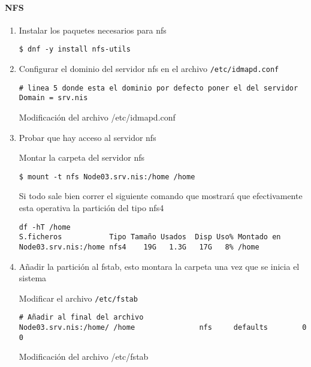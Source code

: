 \documentclass[../main.tex]{subfiles}
\begin{document}
\paragraph{NFS}
\begin{enumerate}
  \item Instalar los paquetes necesarios para \Gls{nfs}
        \begin{listing}[H]
\begin{verbatim}
$ dnf -y install nfs-utils
\end{verbatim}
        \end{listing}
  \item Configurar el dominio del servidor \Gls{nfs} en el
        archivo \texttt{/etc/idmapd.conf}
        \begin{listing}[H]
\begin{verbatim}
# linea 5 donde esta el dominio por defecto poner el del servidor
Domain = srv.nis
\end{verbatim}
          \label{list:idmap}
          \caption{Modificación del archivo /etc/idmapd.conf}
        \end{listing}

  \item Probar que hay acceso al servidor \Gls{nfs}

        Montar la carpeta del servidor \Gls{nfs}
        \begin{listing}[H]
\begin{verbatim}
$ mount -t nfs Node03.srv.nis:/home /home
\end{verbatim}
        \end{listing}

        Si todo sale bien correr el siguiente comando que mostrará que
        efectivamente esta operativa la partición del tipo \Gls{nfs}4
        \begin{listing}[H]
\begin{verbatim}
df -hT /home
S.ficheros           Tipo Tamaño Usados  Disp Uso% Montado en
Node03.srv.nis:/home nfs4    19G   1.3G   17G   8% /home
\end{verbatim}
        \end{listing}

  \item Añadir la partición al \Gls{fstab}, esto montara la carpeta una vez
        que se inicia el sistema

        Modificar el archivo \texttt{/etc/fstab}
        \begin{listing}[H]
\begin{verbatim}
# Añadir al final del archivo
Node03.srv.nis:/home/ /home               nfs     defaults        0 0
\end{verbatim}
          \label{list:fstab}
          \caption{Modificación del archivo /etc/fstab}
        \end{listing}


\end{enumerate}
\end{document}
